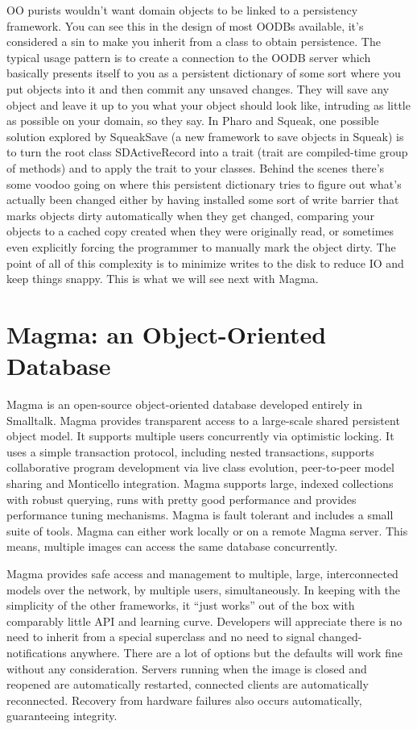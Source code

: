 \documentclass[a4paper,10pt,twoside]{book}
\newcommand{\ct}[1]{{\small\ttfamily\textup{#1}}}
\begin{document}
OO purists wouldn't want domain objects to be linked to a persistency framework. You can see this in the design of most OODBs available, it's considered a sin to make you inherit from a class to obtain persistence. The typical usage pattern is to create a connection to the OODB server which basically presents itself to you as a persistent dictionary of some sort where you put objects into it and then commit any unsaved changes. They will save any object and leave it up to you what your object should look like, intruding as little as possible on your domain, so they say. In Pharo and Squeak, one possible solution  explored by SqueakSave (a new framework to save objects in Squeak) is to turn the root class \ct{SDActiveRecord} into a trait (trait are compiled-time group of methods) and to apply the trait to your classes. Behind the scenes there's some voodoo going on where this persistent dictionary tries to figure out what's actually been changed either by having installed some sort of write barrier that marks objects dirty automatically when they get changed, comparing your objects to a cached copy created when they were originally read, or sometimes even explicitly forcing the programmer to manually mark the object dirty. The point of all of this complexity is to minimize writes to the disk to reduce IO and keep things snappy. This is what we will see next with Magma.

\section{Magma: an Object-Oriented Database}
\label{book:advanced:persistency:magma}

Magma is an open-source object-oriented database developed entirely in Smalltalk. Magma provides transparent access to a large-scale shared persistent object model. It supports multiple users concurrently via optimistic locking. It uses a simple transaction protocol, including nested transactions, supports collaborative program development via live class evolution, peer-to-peer model sharing and Monticello integration. Magma supports large, indexed collections with robust querying, runs with pretty good performance and provides performance tuning mechanisms. Magma is fault tolerant and includes a small suite of tools. Magma can either work locally or on a remote Magma server. This means, multiple images can access the same database concurrently.

Magma provides safe access and management to multiple, large, interconnected models over the network, by multiple users, simultaneously. In keeping with the simplicity of the other frameworks, it ``just works'' out of the box with comparably little API and learning curve. Developers will appreciate there is no need to inherit from a special superclass and no need to signal changed-notifications anywhere. There are a lot of options but the defaults will work fine without any consideration. Servers running when the image is closed and reopened are automatically restarted, connected clients are automatically reconnected. Recovery from hardware failures also occurs automatically, guaranteeing integrity.
\end{document}
